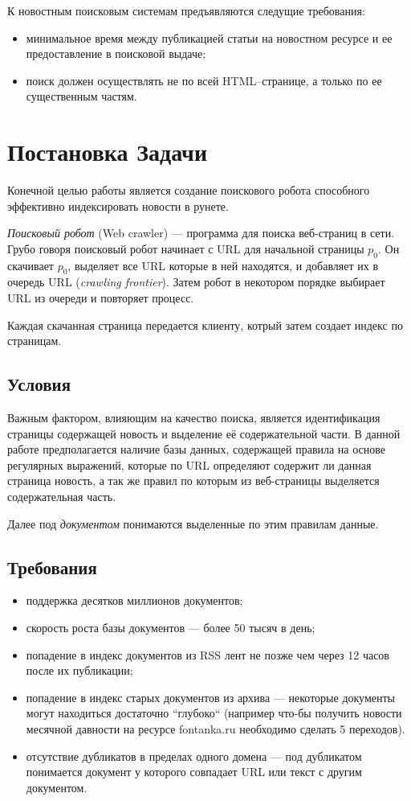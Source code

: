 К новостным поисковым системам предъявляются следущие требования:
\begin{itemize} 
\item минимальное время между публикацией статьи на новостном ресурсе и ее 
    предоставление в поисковой выдаче;
\item поиск должен осуществлять не по всей HTML--странице, а только по ее 
    существенным частям. 
\end{itemize}

\section{Постановка Задачи}
Конечной целью работы является создание поискового робота способного эффективно индексировать новости в рунете.

\textit{Поисковый робот} (Web crawler) --- программа для поиска веб-страниц в сети\cite{crawl}. Грубо говоря поисковый робот начинает с URL для начальной страницы $p_{0}$.
 Он скачивает $p_{0}$, выделяет все URL которые в ней находятся, и добавляет их в очередь URL (\textit{crawling frontier}). Затем робот в некотором порядке выбирает URL из очереди и повторяет процесс.

Каждая скачанная страница передается клиенту, котрый затем создает индекс по страницам.
\subsection{Условия}
Важным фактором, влияющим на качество поиска, является идентификация страницы содержащей новость
 и выделение её содержательной части. В данной работе предполагается наличие базы данных,
 содержащей правила на основе регулярных выражений, которые по URL определяют содержит ли данная страница новость,
 а так же правил по которым из веб-страницы выделяется содержательная часть.

Далее под \textit{документом} понимаются выделенные по этим правилам данные.

\subsection{Требования}
\begin{itemize}
 \item поддержка десятков миллионов документов;
 \item скорость роста базы документов --- более 50 тысяч в день;
 \item попадение в индекс документов из RSS лент не позже чем через 12 часов после их публикации;
 \item попадение в индекс старых документов из архива --- некоторые документы могут находиться достаточно ``глубоко`` (например что-бы получить новости месячной давности на ресурсе fontanka.ru необходимо сделать 5 переходов).
 \item отсутствие дубликатов в пределах одного домена --- под дубликатом понимается документ у которого совпадает URL или текст с другим документом.
\end{itemize}

